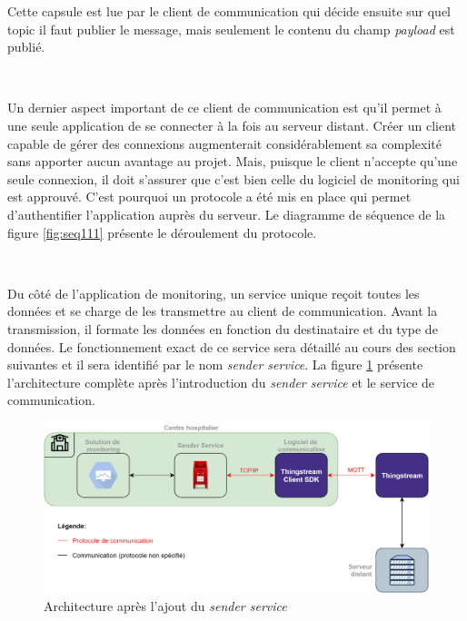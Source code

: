 \noindent
Cette capsule est lue par le client de communication qui décide ensuite sur quel topic il faut publier le message, mais seulement le contenu du champ \textit{payload} est publié.

~

\noindent
Un dernier aspect important de ce client de communication est qu'il permet à une seule application de se connecter à la fois au serveur distant. Créer un client capable de gérer des connexions augmenterait considérablement sa complexité sans apporter aucun avantage au projet. Mais, puisque le client n'accepte qu'une seule connexion, il doit s'assurer que c'est bien celle du logiciel de monitoring qui est approuvé. C'est pourquoi un protocole a été mis en place qui permet d'authentifier l'application auprès du serveur. Le diagramme de séquence de la figure \ref{fig:seq111} présente le déroulement du protocole.




~

\noindent
Du côté de l'application de monitoring, un service unique reçoit toutes les données et se charge de les transmettre au client de communication. Avant la transmission, il formate les données en fonction du destinataire et du type de données. Le fonctionnement exact de ce service sera détaillé au cours des section suivantes et il sera identifié par le nom \textit{sender service}. La figure \ref{fig:sender_arch} présente l'architecture complète après l'introduction du \textit{sender service} et le service de communication.

\begin{figure}[ht!]
  \includegraphics[width=\textwidth]{img/app/sender_arch.png}
  \caption{Architecture après l'ajout du \textit{sender service}}
  \label{fig:sender_arch}
\end{figure}


